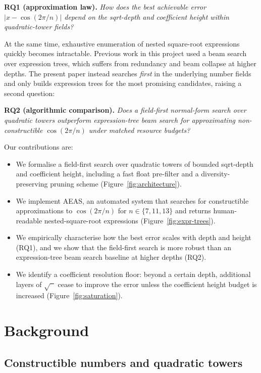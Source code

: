\documentclass[11pt]{article}
\begin{document}
\medskip
\noindent\textbf{RQ1 (approximation law).}
\emph{How does the best achievable error $|x - \cos(2\pi/n)|$ depend on the sqrt-depth and coefficient height within quadratic-tower fields?}

\medskip
At the same time, exhaustive enumeration of nested square-root expressions quickly becomes intractable.
Previous work in this project used a beam search over expression trees, which suffers from redundancy and beam collapse at higher depths.
The present paper instead searches \emph{first} in the underlying number fields and only builds expression trees for the most promising candidates, raising a second question:

\medskip
\noindent\textbf{RQ2 (algorithmic comparison).}
\emph{Does a field-first normal-form search over quadratic towers outperform expression-tree beam search for approximating non-constructible $\cos(2\pi/n)$ under matched resource budgets?}

\medskip
Our contributions are:
\begin{itemize}
  \item We formalise a field-first search over quadratic towers of bounded sqrt-depth and coefficient height, including a fast float pre-filter and a diversity-preserving pruning scheme (Figure~\ref{fig:architecture}).
  \item We implement AEAS, an automated system that searches for constructible approximations to $\cos(2\pi/n)$ for $n \in \{7,11,13\}$ and returns human-readable nested-square-root expressions (Figure~\ref{fig:expr-trees}).
  \item We empirically characterise how the best error scales with depth and height (RQ1), and we show that the field-first search is more robust than an expression-tree beam search baseline at higher depths (RQ2).
  \item We identify a coefficient resolution floor: beyond a certain depth, additional layers of $\sqrt{\phantom{x}}$ cease to improve the error unless the coefficient height budget is increased (Figure~\ref{fig:saturation}).
\end{itemize}

\section{Background}

\subsection{Constructible numbers and quadratic towers}
\end{document}
